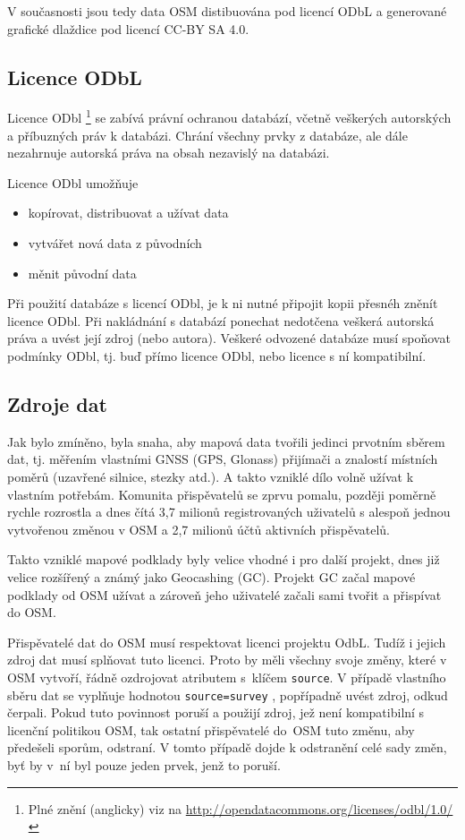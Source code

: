 V současnosti jsou tedy data OSM distibuována pod licencí ODbL a
generované grafické dlaždice pod licencí CC-BY SA 4.0. \cite{OSMlicence}

\subsection{Licence ODbL}
Licence ODbl \footnote{Plné znění (anglicky) viz na \url{http://opendatacommons.org/licenses/odbl/1.0/}}
se zabívá právní ochranou databází, včetně
veškerých autorských a příbuzných práv k databázi.
Chrání všechny prvky z databáze, ale dále nezahrnuje autorská
práva na obsah nezavislý na databázi. 

Licence ODbl umožňuje
\begin{itemize}
    \item    kopírovat, distribuovat a užívat data
    \item    vytvářet nová data z původních
    \item    měnit původní data
\end{itemize}

Při použití databáze s licencí ODbl, je k ni
nutné připojit kopii přesnéh zněnít licence ODbl.
Při nakládnání s databází ponechat nedotčena veškerá autorská práva a
uvést její zdroj (nebo autora).
Veškeré odvozené databáze musí spoňovat podmínky ODbl,
tj. buď přímo licence ODbl, nebo licence s ní kompatibilní.
\cite{Nesetril2013thesis}

\subsection{Zdroje dat}
\label{Zdroje dat}
Jak bylo zmíněno, byla snaha, aby mapová data tvořili jedinci prvotním
sběrem dat, tj. měřením vlastními GNSS (GPS, Glonass) přijímači a
znalostí místních poměrů (uzavřené silnice, stezky atd.).  A takto
vzniklé dílo volně užívat k vlastním potřebám. Komunita přispěvatelů se
zprvu pomalu, později poměrně rychle rozrostla a dnes čítá 3,7 milionů
registrovaných uživatelů s alespoň jednou vytvořenou změnou v OSM a
2,7 milionů účtů aktivních přispěvatelů.\cite{OSMstats}

Takto vzniklé mapové podklady byly velice vhodné i pro další projekt, dnes již
velice rozšířený a známý jako Geocashing (GC). Projekt GC začal mapové
podklady od OSM užívat a zároveň jeho uživatelé začali sami tvořit a
přispívat do OSM. 

Přispěvatelé dat do OSM musí respektovat licenci projektu OdbL.
Tudíž i jejich zdroj dat musí splňovat tuto licenci. Proto by měli
všechny svoje změny, které v OSM vytvoří, řádně ozdrojovat atributem
s~klíčem 
{\tt source}.
V případě vlastního sběru dat se vyplňuje hodnotou
{\tt source=survey} ,
popřípadně uvést zdroj, odkud čerpali. Pokud tuto povinnost poruší a
použijí zdroj, jež není kompatibilní s licenční politikou OSM, tak ostatní 
přispěvatelé do~OSM tuto změnu, aby předešeli sporům, odstraní. 
V tomto případě dojde k odstranění celé sady změn, byť by v~ní byl pouze jeden prvek, jenž to poruší.

